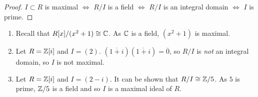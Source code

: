 \begin{proof}
    $I \subset R$ is maximal $\iff$ 
    $R/I$ is a field $\iff$ 
    $R/I$ is an integral domain $\iff$
    $I$ is prime.
\end{proof}

\begin{example}
    \begin{enumerate}
        \item Recall that $R[x]/(x^2 + 1) \cong \mathbb{C}$.
            As $\mathbb{C}$ is a field, $(x^2 + 1)$ is maximal.

        \item Let $R = \mathbb{Z}[i]$ and $I = (2)$.
            $(\overline{1+i})(\overline{1+i}) = \overline 0$,
            so $R/I$ is \emph{not} an integral domain, so $I$ is not maximal.

        \item Let $R = \mathbb{Z}[i]$ and $I = (2-i)$.
            It can be shown that $R/I \cong \mathbb{Z}/5$.
            As $5$ is prime, $\mathbb{Z}/5$ is a field and so $I$ is a maximal ideal of $R$.
    \end{enumerate}
\end{example}
